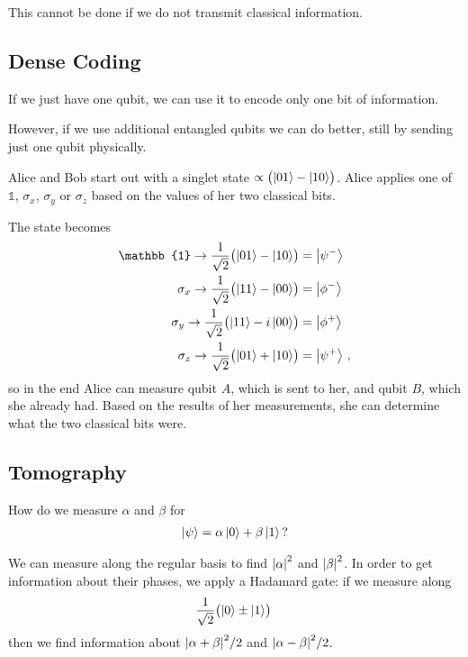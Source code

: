 \documentclass[main.tex]{subfiles}
\begin{document}
This cannot be done if we do not transmit classical information.

\subsection{Dense Coding}

If we just have one qubit, we can use it to encode only one bit of information.

However, if we use additional entangled qubits we can do better, still by sending just one qubit physically. 

Alice and Bob start out with a singlet state \(\propto \qty(\ket{01} - \ket{10})\). 
Alice applies one of \(\mathbb{1}\), \(\sigma_{x}\), \(\sigma_{y}\) or \(\sigma_{z}\) based on the values of her two classical bits.

The state becomes 
%
\begin{align}
\mathbb{1} \rightarrow \frac{1}{\sqrt{2}} \qty(\ket{01} - \ket{10 }) &= \ket{\psi^{-}} \\
\sigma_{x} \rightarrow \frac{1}{\sqrt{2}} \qty(\ket{11} - \ket{00 }) &= \ket{\phi^{-}} \\
\sigma_{y} \rightarrow \frac{1}{\sqrt{2}} \qty(\ket{11} - i\ket{00 }) &= \ket{\phi^{+}} \\
\sigma_{z} \rightarrow \frac{1}{\sqrt{2}} \qty(\ket{01} + \ket{10 }) &= \ket{\psi^{+}} 
\,,
\end{align}
%
so in the end Alice can measure qubit \(A\), which is sent to her, and qubit \(B\), which she already had. 
Based on the results of her measurements, she can determine what the two classical bits were. 

\subsection{Tomography}

How do we measure \(\alpha \) and \(\beta \) for 
%
\begin{align}
\ket{\psi } = \alpha \ket{0} + \beta \ket{1} 
\,?
\end{align}
%

We can measure along the regular basis to find \(\abs{\alpha }^2\) and \(\abs{\beta }^2\). 
In order to get information about their phases, we apply a Hadamard gate: if we measure along 
%
\begin{align}
\frac{1}{\sqrt{2}} \qty(\ket{0} \pm \ket{1})
\,
\end{align}
%
then we find information about \(\abs{\alpha + \beta }^2 / 2\) and \(\abs{\alpha - \beta }^2/2\).
\end{document}

